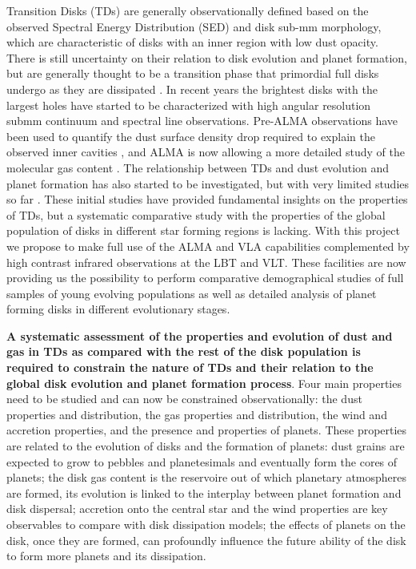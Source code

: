 \documentclass[10pt,fleqn,twoside]{article}
\begin{document}
Transition Disks (TDs) are generally observationally defined based on the observed Spectral Energy
Distribution (SED) and disk sub-mm morphology, which are characteristic of disks with an inner region
with low dust opacity. There is still uncertainty on their relation 
to disk evolution and planet formation, but are generally thought to be a transition phase that
primordial full disks undergo as they are dissipated \citep[see e.g.\ ][]{2011ARA&A..49...67W}. In recent 
years the brightest disks with the largest holes have started to be characterized with high angular resolution submm continuum and spectral line observations. 
Pre-ALMA observations have been used to quantify the dust surface density drop required to 
explain the observed inner cavities \citep[e.g.\ ][]{2011ApJ...732...42A}, and ALMA is now allowing a more 
detailed study of the molecular gas content \citep[e.g.\ ][]{2015A&A...579A.106V}. 
The relationship between TDs and dust evolution and planet formation has also started to be investigated,
but with very limited studies so far \citep[e.g.\ ][]{2014A&A...564A..51P,2015Natur.527..342S}.
These initial studies have provided fundamental insights on the properties of TDs, but a 
systematic comparative study with the properties of the global population of disks in different 
star forming regions is lacking. With this project we propose to make full use of the ALMA and VLA capabilities complemented by high contrast infrared observations at the LBT and VLT. These facilities 
are now providing us the possibility to perform comparative demographical studies of full samples of young evolving populations as well as detailed analysis of planet forming disks in different evolutionary stages. 

{\bf A systematic assessment of the properties and evolution of dust and gas in TDs as compared with the rest of the disk population is required to constrain the nature of TDs and their relation to the global disk evolution and planet formation process}. Four main properties need to be studied and can now be constrained 
observationally: the dust properties and distribution, the gas properties and distribution, the wind and accretion properties, and the presence and properties of planets. These properties are related to the evolution of disks and the formation of planets: dust grains are expected to grow to pebbles and planetesimals and eventually form the cores of planets; the disk gas content is the reservoire out of which planetary atmospheres are formed, its evolution is linked to the interplay between planet formation and disk dispersal; accretion onto the central star and the wind properties are key observables to compare with disk dissipation models; the effects of planets on the disk, once they are formed, can profoundly influence the future ability of the disk to form more planets and its dissipation.
\end{document}
